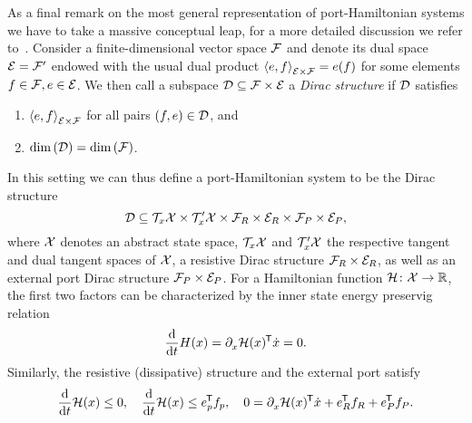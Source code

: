 As a final remark on the most general representation of port-Hamiltonian systems we have to take a massive conceptual leap, for a more detailed discussion we refer to~\cite[Section~2.2]{VanDerSchaft2014}.
Consider a finite-dimensional vector space $\mathcal{F}$ and denote its dual space $\mathcal{E} = \mathcal{F}'$ endowed with the usual dual product ${\langle e, f \rangle}_{\mathcal{E} \times \mathcal{F}} = e(f)$ for some elements $f \in \mathcal{F}, e \in \mathcal{E}$.
We then call a subspace $\mathcal{D} \subseteq \mathcal{F} \times \mathcal{E}$ a \emph{Dirac structure} if $\mathcal{D}$ satisfies
\begin{enumerate}
    \item ${\langle e, f \rangle}_{\mathcal{E} \times \mathcal{F}}$ for all pairs $(f, e) \in \mathcal{D}$, and
    \item $\dim{(\mathcal{D})} = \dim{(\mathcal{F})}$.
\end{enumerate}
In this setting we can thus define a port-Hamiltonian system to be the Dirac structure
\begin{equation*}
    \mathcal{D} \subseteq \mathcal{T}_x \mathcal{X} \times \mathcal{T}'_x \mathcal{X} \times \mathcal{F}_R \times \mathcal{E}_R \times \mathcal{F}_P \times \mathcal{E}_P,
\end{equation*}
where $\mathcal{X}$ denotes an abstract state space, $\mathcal{T}_x \mathcal{X}$ and $\mathcal{T}'_x \mathcal{X}$ the respective tangent and dual tangent spaces of $\mathcal{X}$, a resistive Dirac structure $\mathcal{F}_R \times \mathcal{E}_R$, as well as an external port Dirac structure $\mathcal{F}_P \times \mathcal{E}_P$.
For a Hamiltonian function $\mathcal{H} \colon \mathcal{X} \to \mathbb{R}$, the first two factors can be characterized by the inner state energy preservig relation
\begin{equation*}
    \frac{\mathop{}\!\mathrm{d}}{\mathop{}\!\mathrm{d} t} H(x) = \partial_{x}^{} \mathcal{H}(x)^{\mkern-1.5mu \mathsf{T}} \dot{x} = 0.
\end{equation*}
Similarly, the resistive (dissipative) structure and the external port satisfy
\begin{equation*}
    \frac{\mathop{}\!\mathrm{d}}{\mathop{}\!\mathrm{d} t} \mathcal{H}(x) \leq 0,\quad \frac{\mathop{}\!\mathrm{d}}{\mathop{}\!\mathrm{d} t} \mathcal{H}(x) \leq e_p^{\mkern-1.5mu \mathsf{T}} f_p,\quad 0 = \partial_{x}^{} \mathcal{H}(x)^{\mkern-1.5mu \mathsf{T}} \dot{x} + e_R^{\mkern-1.5mu \mathsf{T}} f_R + e_P^{\mkern-1.5mu \mathsf{T}} f_P.
\end{equation*}

